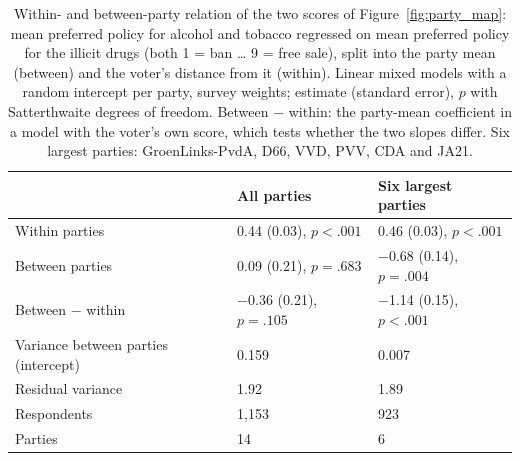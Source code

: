 \begin{table}[H]
\centering\small
\caption{Within- and between-party relation of the two scores of Figure~\ref{fig:party_map}: mean preferred policy for alcohol and tobacco regressed on mean preferred policy for the illicit drugs (both 1 = ban \ldots{} 9 = free sale), split into the party mean (between) and the voter's distance from it (within). Linear mixed models with a random intercept per party, survey weights; estimate (standard error), $p$ with Satterthwaite degrees of freedom. Between $-$ within: the party-mean coefficient in a model with the voter's own score, which tests whether the two slopes differ. Six largest parties: GroenLinks-PvdA, D66, VVD, PVV, CDA and JA21.}
\label{tab:party_within_between}
\begin{tabular}{@{}lll@{}}
\toprule
 & All parties & Six largest parties \\
\midrule
Within parties & 0.44 (0.03), $p < .001$ & 0.46 (0.03), $p < .001$ \\
Between parties & 0.09 (0.21), $p = .683$ & $-$0.68 (0.14), $p = .004$ \\
Between $-$ within & $-$0.36 (0.21), $p = .105$ & $-$1.14 (0.15), $p < .001$ \\
\addlinespace
Variance between parties (intercept) & 0.159 & 0.007 \\
Residual variance & 1.92 & 1.89 \\
Respondents & 1{,}153 & 923 \\
Parties & 14 & 6 \\
\bottomrule
\end{tabular}
\end{table}
